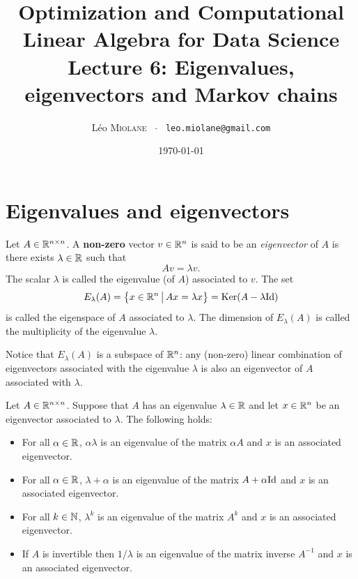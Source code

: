 \documentclass[11pt,nocut]{article}
\title{\vspace{-2.0cm}%
	Optimization and Computational Linear Algebra for Data Science\\
Lecture 6: Eigenvalues, eigenvectors and Markov chains}
\author{Léo \textsc{Miolane} \ $\cdot$ \ \texttt{leo.miolane@gmail.com}}
\date{\today}
\begin{document}
\maketitle


\section{Eigenvalues and eigenvectors}

\begin{definition}
	Let $A \in \mathbb{R}^{n \times n}$. A \textbf{non-zero} vector $v \in \mathbb{R}^n$ is said to be an \emph{eigenvector} of $A$ is there exists $\lambda \in \mathbb{R}$ such that
	$$
	A v = \lambda v.
	$$
	The scalar $\lambda$ is called the eigenvalue (of $A$) associated to $v$. The set
	$$
	E_{\lambda}(A) = \big\{ x \in \mathbb{R}^n \, \big| \, Ax = \lambda x \big\} = {{\rm Ker}}(A-\lambda {{\rm Id}})
	$$
	is called the eigenspace of $A$ associated to $\lambda$. The dimension of $E_{\lambda}(A)$ is called the multiplicity of the eigenvalue $\lambda$.
\end{definition}

\begin{remark}
	Notice that $E_{\lambda}(A)$ is a subspace of $\mathbb{R}^n$: any (non-zero) linear combination of eigenvectors associated with the eigenvalue $\lambda$ is also an eigenvector of $A$ associated with $\lambda$.
\end{remark}

\begin{proposition}
	Let $A \in \mathbb{R}^{n \times n}$. 
	Suppose that $A$ has an eigenvalue $\lambda \in \mathbb{R}$ and let $x \in \mathbb{R}^n$ be an eigenvector associated to $\lambda$.
	The following holds:
	\begin{itemize}
		\item For all $\alpha \in \mathbb{R}$, $\alpha \lambda$ is an eigenvalue of the matrix $\alpha A$ and $x$ is an associated eigenvector.
		\item For all $\alpha \in \mathbb{R}$, $\lambda + \alpha$ is an eigenvalue of the matrix $A + \alpha {{\rm Id}}$ and $x$ is an associated eigenvector.
		\item For all $k \in \mathbb{N}$, $\lambda^k$ is an eigenvalue of the matrix $A^k$ and $x$ is an associated eigenvector.
		\item If $A$ is invertible then $1/\lambda$ is an eigenvalue of the matrix inverse $A^{-1}$ and $x$ is an associated eigenvector.
	\end{itemize}
\end{proposition}
\end{document}
